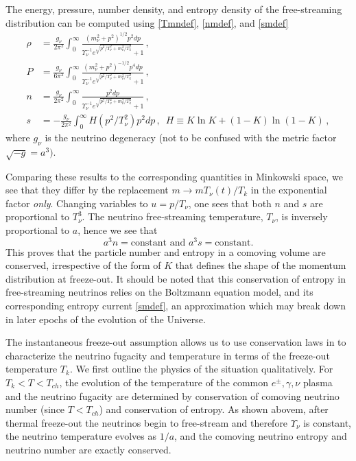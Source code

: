 The energy, pressure, number density, and entropy density of the free-streaming distribution can be computed using \eqref{Tmndef}, \eqref{nmdef}, and \eqref{smdef}
\begin{align}
\rho&=\frac{g_\nu}{2\pi^2}\!\int_0^\infty\!\!\!\frac{\left(m_\nu^2+p^2\right)^{1/2}p^2dp }{\Upsilon_\nu^{-1}e^{\sqrt{p^2/T_\nu^2+m_\nu^2/T_k^2}}+ 1}\,,\label{eq:NeutrinoRho}\\[0.2cm]
P&=\frac{g_\nu}{6\pi^2}\!\int_0^\infty\!\!\!\frac{\left(m_\nu^2+p^2\right)^{-1/2}p^4dp }{\Upsilon_\nu^{-1} e^{\sqrt{p^2/T_\nu^2+m_\nu^2/T_k^2}}+ 1}\,,\label{eq:NeutrinoP}\\[0.2cm]
n&=\frac{g_\nu}{2\pi^2}\!\int_0^\infty\!\!\!\frac{p^2dp }{\Upsilon_\nu^{-1}e^{\sqrt{p^2/T_\nu^2+m_\nu^2/T_k^2}}+ 1}\,,\label{eq:NumDensity}\\[0.3cm]
s&=-\frac{g_\nu}{2\pi^2}\!\int_0^\infty\!\!\!H(p^2/T_\nu^2)p^2dp\,,\,\,\,H\equiv K\ln K +(1-K)\ln(1-K)\,,\label{eq:EntropyIntegrand}
\end{align}
where $g_\nu$ is the neutrino degeneracy (not to be confused with the metric factor $\sqrt{-g}=a^3)$.

Comparing these results to the corresponding quantities in Minkowski space, we see that they differ by the replacement $m\rightarrow m T_\nu(t)/T_k$ in the exponential factor {\em only}. Changing variables to $u=p/T_\nu$, one sees that both $n$ and $s$ are proportional to $T_\nu^3$. The neutrino free-streaming temperature, $T_\nu$, is inversely proportional to $a$, hence we see that
\begin{equation}\label{eq:ConstEntropy}
a^3n=\text{constant}\text{ and } a^3s=\text{constant}.
\end{equation}
This proves that the particle number and entropy in a comoving volume are conserved, irrespective of the form of $K$ that defines the shape of the momentum distribution at freeze-out. It should be noted that this conservation of entropy in free-streaming neutrinos relies on the Boltzmann equation model, and its corresponding entropy current \eqref{smdef}, an approximation which may break down in later epochs of the evolution of the Universe. 

The instantaneous freeze-out assumption allows us to use conservation laws in  to characterize the neutrino fugacity and temperature in terms of the freeze-out temperature $T_k$. We first outline the physics of the situation qualitatively. For $T_k<T<T_{ch}$, the evolution of the temperature of the common $e^\pm,\gamma,\nu$ plasma and the neutrino fugacity are determined by conservation of comoving neutrino number (since $T<T_{ch}$) and conservation of entropy. As shown abovem, after thermal freeze-out the neutrinos begin to free-stream and therefore $\Upsilon_\nu$ is constant, the neutrino temperature evolves as $1/a$, and the comoving neutrino entropy and neutrino number are exactly conserved. 

